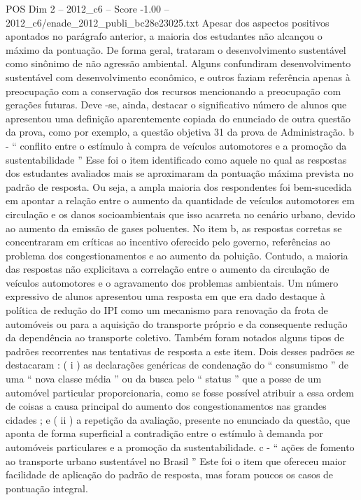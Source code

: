 \begin{textsample}{POS Dim 2 – 2012\_c6 – Score -1.00 – 2012\_c6/enade\_2012\_publi\_bc28e23025.txt}
Apesar dos aspectos positivos apontados no parágrafo anterior, a maioria dos estudantes não alcançou o máximo da pontuação.
De forma geral, trataram o desenvolvimento sustentável como sinônimo de não agressão ambiental.
Alguns confundiram desenvolvimento sustentável com desenvolvimento econômico, e outros faziam referência apenas à preocupação com a conservação dos recursos mencionando a preocupação com gerações futuras.
Deve -se, ainda, destacar o significativo número de alunos que apresentou uma definição aparentemente copiada do enunciado de outra questão da prova, como por exemplo, a questão objetiva 31 da prova de Administração. b - “ conflito entre o estímulo à compra de veículos automotores e a promoção da sustentabilidade ” Esse foi o item identificado como aquele no qual as respostas dos estudantes avaliados mais se aproximaram da pontuação máxima prevista no padrão de resposta.
Ou seja, a ampla maioria dos respondentes foi bem-sucedida em apontar a relação entre o aumento da quantidade de veículos automotores em circulação e os danos socioambientais que isso acarreta no cenário urbano, devido ao aumento da emissão de gases poluentes.
No item b, as respostas corretas se concentraram em críticas ao incentivo oferecido pelo governo, referências ao problema dos congestionamentos e ao aumento da poluição.
Contudo, a maioria das respostas não explicitava a correlação entre o aumento da circulação de veículos automotores e o agravamento dos problemas ambientais.
Um número expressivo de alunos apresentou uma resposta em que era dado destaque à política de redução do IPI como um mecanismo para renovação da frota de automóveis ou para a aquisição do transporte próprio e da consequente redução da dependência ao transporte coletivo.
Também foram notados alguns tipos de padrões recorrentes nas tentativas de resposta a este item.
Dois desses padrões se destacaram : ( i ) as declarações genéricas de condenação do “ consumismo ” de uma “ nova classe média ” ou da busca pelo “ status ” que a posse de um automóvel particular proporcionaria, como se fosse possível atribuir a essa ordem de coisas a causa principal do aumento dos congestionamentos nas grandes cidades ; e ( ii ) a repetição da avaliação, presente no enunciado da questão, que aponta de forma superficial a contradição entre o estímulo à demanda por automóveis particulares e a promoção da sustentabilidade. c - “ ações de fomento ao transporte urbano sustentável no Brasil ” Este foi o item que ofereceu maior facilidade de aplicação do padrão de resposta, mas foram poucos os casos de pontuação integral.

\end{textsample}
